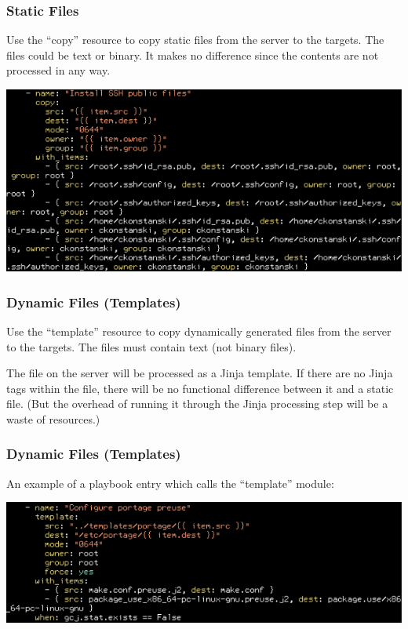 \documentclass[helvetica,english,utf8,notitle,nologo]{beamer}
\begin{document}
\begin{frame}
  \frametitle{Static Files}

  Use the ``copy'' resource to copy static files from the server to
  the targets. The files could be text or binary. It makes no
  difference since the contents are not processed in any way.

  \includegraphics[scale=0.44]{img_20}
\end{frame}

\begin{frame}
  \frametitle{Dynamic Files (Templates)}

  Use the ``template'' resource to copy dynamically generated files
  from the server to the targets. The files must contain text (not
  binary files).

  The file on the server will be processed as a Jinja template. If
  there are no Jinja tags within the file, there will be no functional
  difference between it and a static file. (But the overhead of
  running it through the Jinja processing step will be a waste of
  resources.)
\end{frame}

\begin{frame}
  \frametitle{Dynamic Files (Templates)}

  An example of a playbook entry which calls the ``template'' module:

  \includegraphics[scale=0.44]{img_21}
\end{frame}
\end{document}
